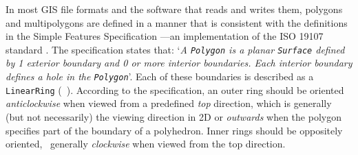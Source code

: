 In most GIS file formats and the software that reads and writes them, polygons and multipolygons are defined in a manner that is consistent with the definitions in the Simple Features Specification \citep{SimpleFeatures1,ISO19125-1:2006}---an implementation of the ISO 19107 standard \citep{ISO19107:2005}.
The specification states that: `\emph{A \texttt{Polygon} is a planar \texttt{Surface} defined by 1 exterior boundary and 0 or more interior boundaries. Each interior boundary defines a hole in the \texttt{Polygon}}'.
Each of these boundaries is described as a \texttt{LinearRing} (\cf\ ).
According to the specification, an outer ring should be oriented \emph{anticlockwise} when viewed from a predefined \emph{top} direction, which is generally (but not necessarily) the viewing direction in 2D or \emph{outwards} when the polygon specifies part of the boundary of a polyhedron.
Inner rings should be oppositely oriented, \ie\ generally \emph{clockwise} when viewed from the top direction.

